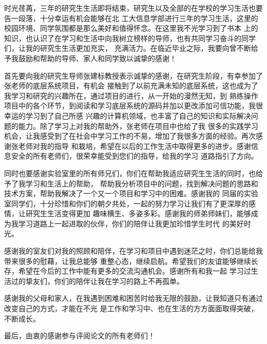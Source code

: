 \begin{acknowledgement}

时光荏苒，三年的研究生生活即将结束，研究生以及全部的在学校的学习生活也要告一段落，十分幸运有机会能够在北
工大信息学部进行三年的学习生活，这里的校园环境、同学氛围都是那么美好和值得怀念。在这里我不光学习到了书本
上的知识，也认识了在学习和生活中向我树立榜样的导师，也有共同学习奋斗的同学们，让我的研究生生活更加充实，
充满活力。在临近毕业之际，我要向曾不断给予我鼓励和帮助的导师、家人和同学致以诚挚的感谢！
\par 首先要向我的研究生导师张建标教授表示诚挚的感谢，在研究生阶段，有幸参加了张老师的底层系统项目，有机会
接触到了以前充满未知的底层系统，这也成为了我学习和研究的兴趣所在，通过项目的进行，从一开始的漫然无知，到
熟练操作项目中的各个环节，到阅读和学习底层系统的源码并加以更改添加可信功能，我很幸运的学习到了自己所感
兴趣的计算机领域，也丰富了自己的知识和实际解决问题的能力。除了学习上对我的帮助外，张老师在项目中也给了我
很多的实践学习机会，让我感受到了在社会中学习工作的不易，增加了我很多方面的经验。再次感谢张老师对我的指导
和栽培，希望在以后的工作生活中取得更多的进步。感谢信息安全的所有老师们，很荣幸能受到您们的指导，给我的学习
道路指引了方向。
\par 同时也要感谢实验室里的所有师兄们，你们在帮助我适应研究生生活的同时，也给予了我学习和生活上的帮助，
帮助我分析项目中的问题，找到解决问题的思路和技术方案，帮助我解决了一个又一个项目和学习中的困难。感谢我的
同届的实验室同学们，十分珍惜和你们的朝夕共处，一起的努力学习让我们有了更深厚的感情，让研究生生活变得更加
趣味横生、多姿多彩。感谢我的师弟师妹们，能够成为我学习道路上一起进取的伙伴，你们的陪伴让我更加珍惜学生时代
的美好时光。
\par 感谢我的室友们对我的照顾和陪伴，在学习和项目中遇到迷茫之时，你们总能给我带来很多的慰藉，让我总能够
重整心态，继续启航。希望我们的友谊能够继续长存，希望在今后的工作中能有更多的交流沟通机会。感谢所有和我一起
学习过生活过的挚友们，你们的陪伴让我在学习的路上不再孤单。
\par 感谢我的父母和家人，在我遇到困难和困苦时给我无限的鼓励，让我知道只有通过改变自己的方式，才能在不光
是工作和学习中、也在生活的方方面面取得突破，不断成长。
\par 最后，由衷的感谢参与评阅论文的所有老师们！



\end{acknowledgement}
